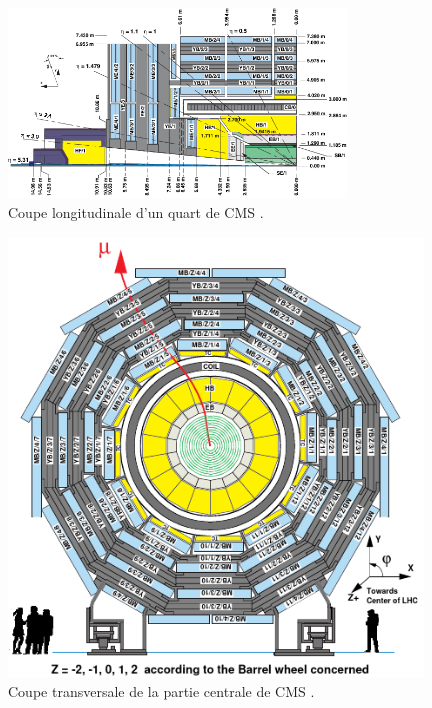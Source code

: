 \begin{figure}
\centering
\includegraphics[width=0.80\textwidth]{CMS/CMSLONG.png}
\captionsetup{type=figure}\caption{Coupe longitudinale d'un quart de CMS \cite{Chatrchyan:1223944}.}
\label{CMS1}
\end{figure}


\begin{figure}[p]
\centering
\includegraphics[width=0.98\textwidth]{CMS/CMSTRANS.png}
\captionsetup{type=figure}\caption{Coupe transversale de la partie centrale de CMS \cite{Chatrchyan:1223944}.}
\label{CMS2}
\end{figure}

